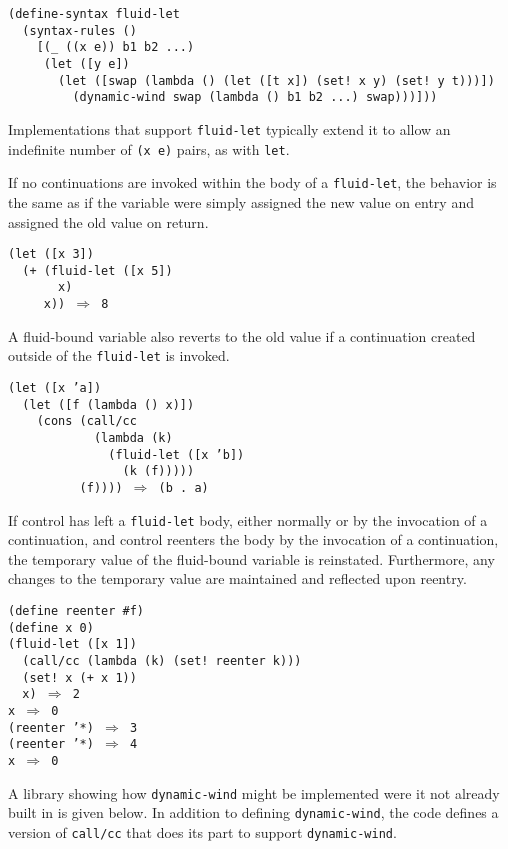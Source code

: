 \begin{alltt}
(define-syntax fluid-let
  (syntax-rules ()
    [(\_{} ((x e)) b1 b2 ...)
     (let ([y e])
       (let ([swap (lambda () (let ([t x]) (set! x y) (set! y t)))])
         (dynamic-wind swap (lambda () b1 b2 ...) swap)))]))
\end{alltt}


Implementations that support \texttt{fluid-let} typically extend it to
allow an indefinite number of \texttt{(x e)} pairs, as with \texttt{let}.


If no continuations are invoked within the body of a \texttt{fluid-let},
the behavior is the same as if the variable were simply assigned
the new value on entry and assigned the old value on return.


\begin{alltt}
(let ([x 3])
  (+ (fluid-let ([x 5])
       x)
     x)) \(\Rightarrow\) 8
\end{alltt}


A fluid-bound variable also reverts to the old value if a continuation
created outside of the \texttt{fluid-let} is invoked.


\begin{alltt}
(let ([x 'a])
  (let ([f (lambda () x)])
    (cons (call/cc
            (lambda (k)
              (fluid-let ([x 'b])
                (k (f)))))
          (f)))) \(\Rightarrow\) (b . a)
\end{alltt}


If control has left a \texttt{fluid-let} body, either normally
or by the invocation of a continuation, and control reenters the
body by the invocation of a continuation, the temporary value of
the fluid-bound variable is reinstated.
Furthermore, any changes to the temporary value are maintained
and reflected upon reentry.


\begin{alltt}
(define reenter \#{}f)
(define x 0)
(fluid-let ([x 1])
  (call/cc (lambda (k) (set! reenter k)))
  (set! x (+ x 1))
  x) \(\Rightarrow\) 2
x \(\Rightarrow\) 0
(reenter '*) \(\Rightarrow\) 3
(reenter '*) \(\Rightarrow\) 4
x \(\Rightarrow\) 0
\end{alltt}


A library showing how \texttt{dynamic-wind} might be implemented
were it not already built in is given below.
In addition to defining \texttt{dynamic-wind}, the code defines
a version of
\label{control_s62}\texttt{call/cc}
that does its part to support \texttt{dynamic-wind}.


